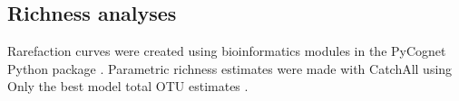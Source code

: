 \subsection{Richness analyses}
Rarefaction curves were created using bioinformatics modules in the PyCognet Python package \citep{Knight_2007}. Parametric richness estimates were made with CatchAll using Only the best model total OTU estimates \citep{BUNGE_2010}.













